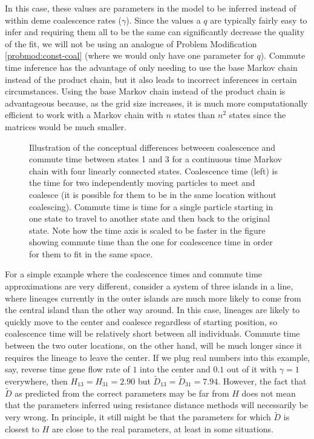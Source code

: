 \documentclass{article}
\newcommand{\Dcom}{\widetilde D}
\begin{document}
In this case, these values
are parameters in the model to be inferred instead of within deme coalescence rates ($\gamma$).
Since the values a $q$ are typically fairly easy to infer 
and requiring them all to be the same can significantly decrease the quality of the fit, 
we will not be using an analogue of Problem Modification \ref{probmod:const-coal} 
(where we would only have one parameter for $q$).
Commute time inference has the advantage of only needing to use the base Markov chain
instead of the product chain,
but it also leads to incorrect inferences in certain circumstances.
Using the base Markov chain instead of the product chain is advantageous 
because, as the grid size increases, it is much more computationally efficient 
to work with a Markov chain with $n$ states than $n^2$ states 
since the matrices would be much smaller.

\begin{figure}
\centering
\caption{Illustration of the conceptual differences
betweeen coalescence and commute time between states 1 and 3 
for a continuous time Markov chain with four linearly connected states. 
Coalescence time (left) is the time for two independently moving particles to meet and coalesce 
(it is possible for them to be in the same location without coalescing).
Commute time is time for a single particle starting in one state to travel to another state 
and then back to the original state.
Note how the time axis is scaled to be faster in the figure showing commute time
than the one for coalescence time in order for them to fit in the same space.}
\label{fig:concept_coalcom}
\end{figure}

For a simple example where the coalescence times and commute time approximations are very different, 
consider a system of three islands in a line,
where lineages currently in the outer islands are much more likely to come from the central island
than the other way around.
In this case, lineages are likely to quickly move to the center and coalesce regardless of starting position,
so coalescence time will be relatively short between all individuals.
Commute time between the two outer locations, on the other hand,
will be much longer since it requires the lineage to leave the center.
If we plug real numbers into this example, say, 
reverse time gene flow rate of $1$ into the center and $0.1$ out of it
with $\gamma=1$ everywhere,
then $H_{13}=H_{31}=2.90$ but $\Dcom_{13}=\Dcom_{31}=7.94$.
However, the fact that $\Dcom$ as predicted from the correct parameters may be far from $H$
does not mean that the parameters inferred using resistance distance methods
will necessarily be very wrong.
In principle, it still might be that the parameters for which $\Dcom$ is closest to $H$ 
are close to the real parameters, 
at least in some situations.
\end{document}
